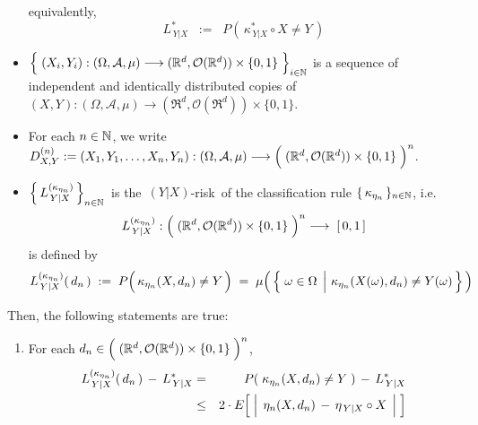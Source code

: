 \begin{theorem}
\begin{itemize}
	equivalently,
	\begin{equation*}
	L^{*}_{\,Y \vert X} \;\; := \;\; P\!\left(\, \kappa^{*}_{\,Y \vert X} \circ X \neq Y \,\right)
	\end{equation*}	
\item
	$\left\{\;
		(X_{i},Y_{i}) : (\Omega,\mathcal{A},\mu)
			\overset{{\color{white}-}}{\longrightarrow}
			(\Re^{d},\mathcal{O}(\Re^{d})) \times \{0,1\}
	\;\right\}_{i\in\N}$\;
	is a sequence of independent and identically distributed copies of
	$(X,Y) : (\Omega,\mathcal{A},\mu) \longrightarrow (\Re^{d},\mathcal{O}(\Re^{d})) \times \{0,1\}$.
\item
	For each $n \in \mathbb{N}$, we write
	$D^{(n)}_{X,Y} := (X_{1},Y_{1},\ldots,X_{n},Y_{n}) :
		(\Omega,\mathcal{A},\mu)
		\longrightarrow
		\left(\;(\Re^{d},\mathcal{O}(\Re^{d})) \overset{{\color{white}.}}{\times} \{0,1\} \;\right)^{n}$.
\item
	$\left\{\,L^{(\kappa_{\eta_{n}})}_{\,Y \vert X}\,\right\}_{n\in\mathbb{N}}$\,
	is the \,$(Y \vert X)$-risk\, of the classification rule $\{\,\kappa_{\eta_{n}}\,\}_{n\in\mathbb{N}}$, i.e.
	\begin{equation*}
	L^{(\kappa_{\eta_{n}})}_{\,Y \vert X} :
		\left(\;(\Re^{d},\mathcal{O}(\Re^{d})) \overset{{\color{white}.}}{\times} \{0,1\} \;\right)^{n} \longrightarrow\; [\,0,1\,]
	\end{equation*}
	is defined by
	\begin{equation*}
	L^{(\kappa_{\eta_{n}})}_{\,Y \vert X}(\,d_{n}\,)
	\; := \;
		P\!\left(\, \kappa_{\eta_{n}}(X,d_{n}) \overset{{\color{white}.}}{\neq} Y \,\right)
	\; = \;
		\mu\!\left(\,\left\{\,
			\left.\omega\overset{{\color{white}.}}{\in}\Omega\;\,\right\vert\,\kappa_{\eta_{n}}(X(\omega),d_{n}) \neq Y(\omega)
			\,\right\}\,\right)
	\end{equation*}
\end{itemize}
Then, the following statements are true:
\begin{enumerate}
\item
	For each
	\;$d_{n} \in \left(\;(\Re^{d},\mathcal{O}(\Re^{d})) \overset{{\color{white}.}}{\times} \{0,1\} \;\right)^{n}$,
	\begin{eqnarray*}
	L^{(\kappa_{\eta_{n}})}_{\,Y \vert X}(\,d_{n}\,) \, - \, L^{*}_{\,Y \vert X}
	& = &
		P\!\left(\;\kappa_{\eta_{n}}(X,d_{n}) \neq Y \;\right) \,-\, L^{*}_{\,Y \vert X}
	\\
	& \leq &
		2 \cdot E\!\left[\;
			\left\vert\;\, \eta_{n}(X,d_{n}) \,\overset{{\color{white}.}}{-}\, \eta_{\,Y\vert X} \circ X \;\,\right\vert
			\;\right]
	\\

\end{eqnarray*}
\end{enumerate}
\end{theorem}
